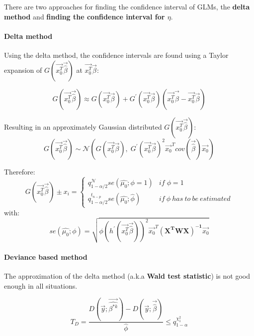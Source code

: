 There are two approaches for finding the confidence interval of GLMs, the \textbf{delta method} and \textbf{finding the confidence interval for $\eta$}.

\paragraph{Delta method}
Using the delta method, the confidence intervals are found using a Taylor expansion of $G(\vec{x_0^T}\vec{\hat{\beta}})$ at $\vec{x_0^T}\vec{\beta}$:

\begin{equation*}
G(\vec{x_0^T}\vec{\hat{\beta}}) \approx G(\vec{x_0^T}\vec{\beta}) + G^{'}(\vec{x_0^T}\vec{\beta}) (\vec{x_0^T}\vec{\hat{\beta}} - \vec{x_0^T}\vec{\beta})
\end{equation*}

Resulting in an approximately Gaussian distributed $G(\vec{x_0^T}\vec{\hat{\beta}})$:
\begin{equation*}
G(\vec{x_0^T}\vec{\hat{\beta}}) \sim \mathcal{N}\left (G(\vec{x_0^T}\vec{\beta}),\; G^{'}(\vec{x_0^T}\vec{\beta})^2 \vec{x_0}^T cov(\vec{\hat{\beta}})\vec{x_0}\right)
\end{equation*}

Therefore:
\begin{equation*}
G(\vec{x_0^T}\vec{\hat{\beta}}) \pm x_i = \begin{cases}
q^\mathcal{N}_{1-\alpha/2}se(\hat{\mu_0};\phi=1) & if\; \phi = 1 \\
q^{t_{n-p}}_{1-\alpha/2}se(\hat{\mu_0};\hat {\phi}) & if\: \phi\: has\: to\: be\: estimated
\end{cases}
\end{equation*}
with:
\begin{equation*}
se(\hat{\mu_0};\phi) = \sqrt{\phi \left(h^{'}(\vec{x_0^T}\vec{\hat{\beta}})\right)^2 \vec{x_0}^T\bm{(X^TWX)^{-1}}\vec{x_0}}
\end{equation*}

\paragraph{Deviance based method}
The approximation of the delta method (a.k.a \textbf{Wald test statistic}) is not good enough in all situations.

\begin{equation*}
T_D = \frac{D(\vec{y};\vec{\hat{\beta^{*k}}})-D(\vec{y};\vec{\hat{\beta}})}{\hat{\phi}} \leq q^{\chi^2_1}_{1-\alpha}
\end{equation*}

